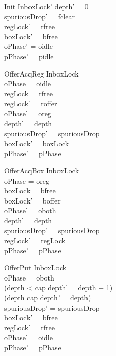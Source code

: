 \documentclass[a4paper,10pt,fleqn]{article}
\begin{document}
\begin{schema}{Init}
  InboxLock'
\where
  depth' = 0 \\
  spuriousDrop' = fclear \\
  regLock' = rfree \\
  boxLock' = bfree \\
  oPhase' = oidle \\
  pPhase' = pidle
\end{schema}


\begin{schema}{OfferAcqReg}
  \Delta InboxLock \\
\where
  oPhase = oidle \\
  regLock = rfree \\
  regLock' = roffer \\
  oPhase' = oreg \\
  depth' = depth \\
  spuriousDrop' = spuriousDrop \\
  boxLock' = boxLock \\
  pPhase' = pPhase
\end{schema}

\begin{schema}{OfferAcqBox}
  \Delta InboxLock \\
\where
  oPhase = oreg \\
  boxLock = bfree \\
  boxLock' = boffer \\
  oPhase' = oboth \\
  depth' = depth \\
  spuriousDrop' = spuriousDrop \\
  regLock' = regLock \\
  pPhase' = pPhase
\end{schema}

\begin{schema}{OfferPut}
  \Delta InboxLock \\
\where
  oPhase = oboth \\
  (depth < cap \implies depth' = depth + 1) \\
  (depth \geq cap \implies depth' = depth) \\
  spuriousDrop' = spuriousDrop \\
  boxLock' = bfree \\
  regLock' = rfree \\
  oPhase' = oidle \\
  pPhase' = pPhase
\end{schema}
\end{document}

